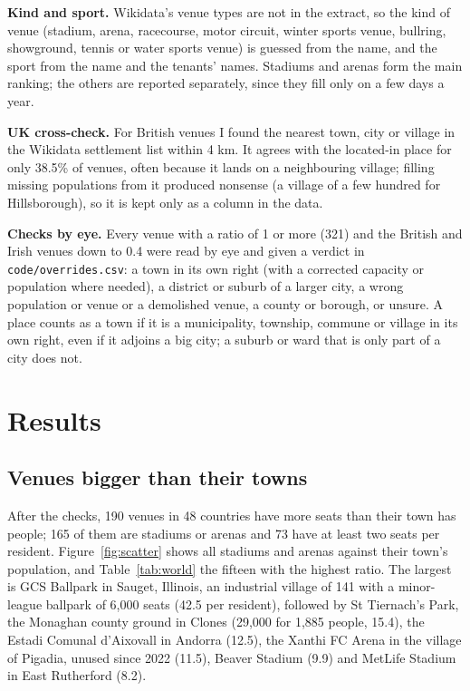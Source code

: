 \documentclass[11pt,a4paper]{article}
\begin{document}
\textbf{Kind and sport.} Wikidata's venue types are not in the extract, so the kind of venue (stadium, arena, racecourse, motor circuit, winter sports venue, bullring, showground, tennis or water sports venue) is guessed from the name, and the sport from the name and the tenants' names. Stadiums and arenas form the main ranking; the others are reported separately, since they fill only on a few days a year.

\textbf{UK cross-check.} For British venues I found the nearest town, city or village in the Wikidata settlement list within 4 km. It agrees with the located-in place for only 38.5\% of venues, often because it lands on a neighbouring village; filling missing populations from it produced nonsense (a village of a few hundred for Hillsborough), so it is kept only as a column in the data.

\textbf{Checks by eye.} Every venue with a ratio of 1 or more (321) and the British and Irish venues down to 0.4 were read by eye and given a verdict in \texttt{code/overrides.csv}: a town in its own right (with a corrected capacity or population where needed), a district or suburb of a larger city, a wrong population or venue or a demolished venue, a county or borough, or unsure. A place counts as a town if it is a municipality, township, commune or village in its own right, even if it adjoins a big city; a suburb or ward that is only part of a city does not.

\section{Results}
\subsection{Venues bigger than their towns}
After the checks, 190 venues in 48 countries have more seats than their town has people; 165 of them are stadiums or arenas and 73 have at least two seats per resident. Figure~\ref{fig:scatter} shows all stadiums and arenas against their town's population, and Table~\ref{tab:world} the fifteen with the highest ratio. The largest is GCS Ballpark in Sauget, Illinois, an industrial village of 141 with a minor-league ballpark of 6,000 seats (42.5 per resident), followed by St Tiernach's Park, the Monaghan county ground in Clones (29,000 for 1,885 people, 15.4), the Estadi Comunal d'Aixovall in Andorra (12.5), the Xanthi FC Arena in the village of Pigadia, unused since 2022 (11.5), Beaver Stadium (9.9) and MetLife Stadium in East Rutherford (8.2).
\end{document}

